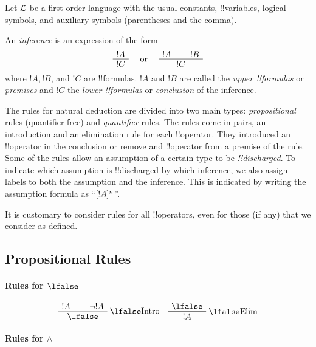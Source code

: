 \documentclass[../../../include/open-logic-section]{subfiles}
\begin{document}


Let $\mathcal L$ be a first-order language with the usual constants,
!!{variable}s, logical symbols, and auxiliary symbols (parentheses
and the comma).

\begin{defn}[Inference]
An \emph{inference} is an expression of the form
\[
\AxiomC{$!A$}
\UnaryInfC{$!C$}
\DisplayProof
\quad
\textrm{  or  }
\quad
\AxiomC{$!A$}
\AxiomC{$!B$}
\BinaryInfC{$!C$}
\DisplayProof
\]
where $!A, !B$, and $!C$ are !!{formula}s. $!A$ and $!B$ are called
the \emph{upper !!{formula}s} or \emph{premises} and $!C$ the
\emph{lower !!{formula}s} or \emph{conclusion} of the inference.
\end{defn}

The rules for natural deduction are divided into two main types:
\emph{propositional} rules (quantifier-free) and \emph{quantifier}
rules.  The rules come in pairs, an introduction and an elimination
rule for each !!{operator}. They introduced an !!{operator} in the
conclusion or remove and !!{operator} from a premise of the rule.
Some of the rules allow an assumption of a certain type to be
\emph{!!{discharged}}. To indicate which assumption is !!{discharged}
by which inference, we also assign labels to both the assumption and
the inference.  This is indicated by writing the assumption formula as
``$[!A]^{n}$''.

It is customary to consider rules for all !!{operator}s, even for
those (if any) that we consider as defined.

\subsection{Propositional Rules}

\paragraph{Rules for $\lfalse$}

\[
\AxiomC{$!A$}
\AxiomC{$\lnot !A$}
\RightLabel{\Intro{\lfalse}}
\BinaryInfC{$\lfalse$}
\DisplayProof
\quad
\AxiomC{$\lfalse$}
\RightLabel{\Elim{\lfalse}}
\UnaryInfC{$!A$}
\DisplayProof
\]

\paragraph{Rules for $\land$}
\end{document}
